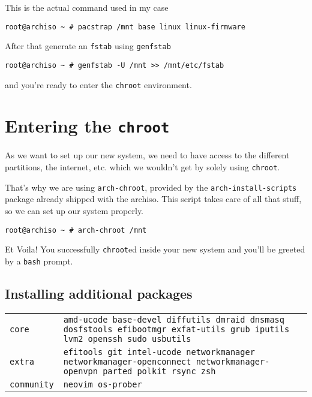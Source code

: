 \documentclass[9pt]{report}
\newenvironment{NOTE}
{\begin{tcolorbox}[colback=admonitionBG,coltitle=draculaFG,colframe=draculaBlue,colbacktitle=draculaBlue,title=NOTE]}
{\end{tcolorbox}}
\newenvironment{packagetable}
{\begin{longtabu}to \textwidth [b]{X[1,r]|X[1,l]}}
{\end{longtabu}}
\begin{document}
\begin{NOTE}
    This is the actual command used in my case


    \begin{verbatim}
root@archiso ~ # pacstrap /mnt base linux linux-firmware
    \end{verbatim}
\end{NOTE}
After that generate an \texttt{fstab} using \texttt{genfstab}


\begin{verbatim}
root@archiso ~ # genfstab -U /mnt >> /mnt/etc/fstab
\end{verbatim}

and you’re ready to enter the \texttt{chroot} environment.


\newpage

\hypertarget{x-entering-the-chroot}{\chapter{Entering the \texttt{chroot}}}
\begin{NOTE}
    As we want to set up our new system, we need to have access to the different partitions, the internet, etc. which we wouldn’t get by solely using \texttt{chroot}.


    That’s why we are using \texttt{arch-chroot}, provided by the \texttt{arch-install-scripts} package already shipped with the archiso.
    This script takes care of all that stuff, so we can set up our system properly.

\end{NOTE}
\begin{verbatim}
root@archiso ~ # arch-chroot /mnt
\end{verbatim}

Et Voila! You successfully \texttt{chroot}ed inside your new system and you’ll be greeted by a \texttt{bash} prompt.



\newpage

\hypertarget{x-installing-additional-packages}{\section{Installing additional packages}}
\begin{packagetable}
    \texttt{core} & \texttt{amd-ucode base-devel diffutils dmraid dnsmasq dosfstools efibootmgr exfat-utils grub iputils lvm2 openssh sudo usbutils} \\ 
    \texttt{extra} & \texttt{efitools git intel-ucode networkmanager networkmanager-openconnect networkmanager-openvpn parted polkit rsync zsh} \\ 
    \texttt{community} & \texttt{neovim os-prober} \\ 
\end{packagetable}
\end{document}
